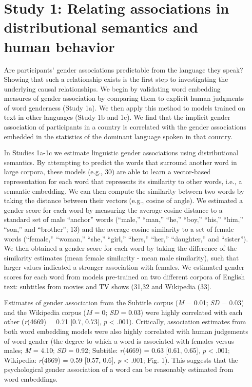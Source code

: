 \documentclass[9pt,twocolumn]{pnas-new}
\begin{document}
\section*{Study 1: Relating associations in distributional semantics and
human
behavior}\label{study-1-relating-gender-biases-in-distributional-semantics-and-human-behavior}

Are participants' gender associations predictable from the language they
speak? Showing that such a relationship exists is the first step to investigating the underlying causal relationships. We begin by validating word embedding measures of
gender association by comparing them to explicit human judgments of word
genderness (Study 1a). We then apply this method to models trained on
text in other languages (Study 1b and 1c). We find that the implicit gender
association of participants in a country is correlated with the gender associations embedded in the statistics of the dominant language spoken in that country.


In Studies 1a-1c we estimate linguistic gender associations using distributional semantics. By attempting to predict the words that surround another word in large corpora, these models   (e.g., 30) are able to learn a vector-based representation for each word that represents its similarity to other words, i.e., a semantic embedding. We can then compute the similarity between two words by taking the distance between their vectors (e.g., cosine of angle). 
We estimated a gender score for each word by measuring the average cosine distance to a standard set of
male \enquote{anchor} words (\enquote{male,} \enquote{man,}
\enquote{he,} \enquote{boy,} \enquote{his,} \enquote{him,}
\enquote{son,} and \enquote{brother}; 13)
and the average cosine similarity to a set of female words
(\enquote{female,} \enquote{woman,} \enquote{she,} \enquote{girl,}
\enquote{hers,} \enquote{her,} \enquote{daughter,} and
\enquote{sister}). We then obtained a gender score for each word by
taking the difference of the similarity estimates (mean female similarity
- mean male similarity), such that larger values indicated a stronger
association with females. We estimated  gender scores for each word from
models pre-trained on two different corpora of English text: subtitles from movies
and TV shows (31,32 and Wikipedia
(33).

Estimates of gender association from the Subtitle corpus (\emph{M} = 0.01;
\emph{SD} = 0.03) and the Wikipedia corpus (\emph{M} = 0; \emph{SD} =
0.03) were highly correlated with each other (\emph{r}(4669) = 0.71 {[}0.7, 0.73{]}, \emph{p} \textless{} .001). Critically, association estimates from both word embedding
models were also highly correlated with human judgements of word gender (the degree to which a word is associated with females versus males; \emph{M} = 4.10; \emph{SD} = 0.92; Subtitle: \emph{r}(4669) = 0.63 {[}0.61, 0.65{]}, \emph{p} \textless{} .001; Wikipedia: \emph{r}(4669) = 0.59 {[}0.57, 0.6{]}, \emph{p} \textless{} .001; Fig. 1). This suggests that the psychological gender association of a word can be reasonably estimated from word embeddings.
\end{document}

